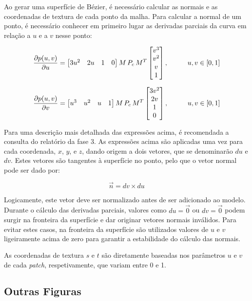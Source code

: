 \documentclass[12pt, a4paper]{article}
\begin{document}
Ao gerar uma superfície de Bézier, é necessário calcular as normais e as coordenadas de textura de
cada ponto da malha. Para calcular a normal de um ponto, é necessário conhecer em primeiro lugar as
derivadas parciais da curva em relação a $u$ e a $v$ nesse ponto:

$$
\def\arraystretch{1}
\frac{\partial p(u, v)}{\partial u} =
\begin{bmatrix}
    3 u^2 & 2 u & 1 & 0
\end{bmatrix}
M \, P_c \, M^T
\begin{bmatrix}
    v^3 \\ v^2 \\ v \\ 1
\end{bmatrix},
\hspace{1cm}
u, v \in \left [ 0, 1 \right ]
$$

$$
\def\arraystretch{1}
\frac{\partial p(u, v)}{\partial v} =
\begin{bmatrix}
    u^3 & u^2 & u & 1
\end{bmatrix}
M \, P_c \, M^T
\begin{bmatrix}
    3 v^2 \\ 2 v \\ 1 \\ 0
\end{bmatrix},
\hspace{1cm}
u, v \in \left [ 0, 1 \right ]
$$

Para uma descrição mais detalhada das expressões acima, é recomendada a consulta do relatório da
fase 3. As expressões acima são aplicadas uma vez para cada coordenada, $x$, $y$, e $z$, dando
origem a dois vetores, que se denominarão $du$ e $dv$. Estes vetores são tangentes à superfície no
ponto, pelo que o vetor normal pode ser dado por:

$$
\vec{n} = dv \times du
$$

Logicamente, este vetor deve ser normalizado antes de ser adicionado ao modelo. Durante o cálculo
das derivadas parciais, valores como $du = \vec{0}$ ou $dv = \vec{0}$ podem surgir na fronteira da
superfície e dar originar vetores normais inválidos. Para evitar estes casos, na fronteira da
superfície são utilizados valores de $u$ e $v$ ligeiramente acima de zero para garantir a
estabilidade do cálculo das normais.

As coordenadas de textura $s$ e $t$ são diretamente baseadas nos parâmetros $u$ e $v$ de cada
\emph{patch}, respetivamente, que variam entre 0 e 1.

\subsection{Outras Figuras}
\end{document}
